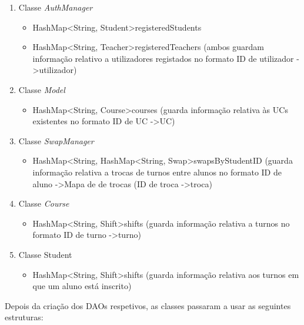 \documentclass[a4paper]{article}
\begin{document}
\begin{enumerate}
   \item Classe \emph{AuthManager}
   \begin{itemize}
     \item HashMap\textless String, Student\textgreater registeredStudents 
     \item HashMap\textless String, Teacher\textgreater registeredTeachers (ambos guardam informação relativo a utilizadores registados no formato ID de utilizador -\textgreater utilizador)
   \end{itemize}
   \item Classe \emph{Model}
   \begin{itemize}
       \item HashMap\textless String, Course\textgreater courses (guarda informação relativa às UCs existentes no formato ID de UC -\textgreater UC)
   \end{itemize}
   \item Classe \emph{SwapManager}
   \begin{itemize}
       \item HashMap\textless String, HashMap\textless String, Swap\textgreater swapsByStudentID (guarda informação relativa a trocas de turnos entre alunos no formato ID de aluno -\textgreater Mapa de de trocas (ID de troca -\textgreater troca)
   \end{itemize}
   \item Classe \emph{Course}
   \begin{itemize}
       \item HashMap\textless String, Shift\textgreater shifts (guarda informação relativa a turnos no formato ID de turno -\textgreater turno)
   \end{itemize}
   \item Classe {Student}
   \begin{itemize}
       \item HashMap\textless String, Shift\textgreater shifts (guarda informação relativa aos turnos em que um aluno está inscrito)
   \end{itemize}
\end{enumerate}

Depois da criação dos DAOs respetivos, as classes passaram a usar as seguintes estruturas:
\end{document}
